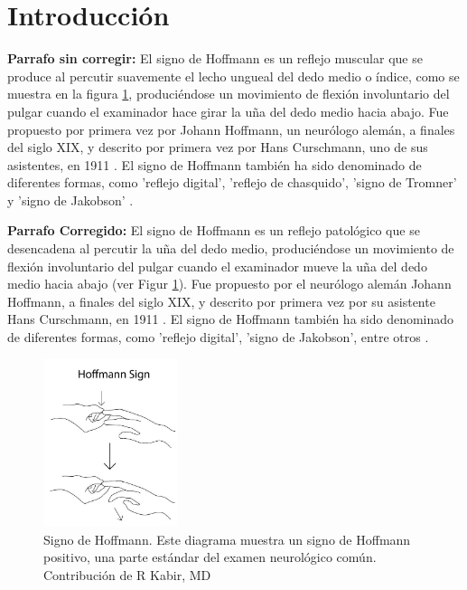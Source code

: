 \section{Introducción}
\textbf{Parrafo sin corregir:} El signo de Hoffmann es un reflejo muscular que se produce al percutir suavemente el lecho ungueal del dedo medio o índice, como se muestra en la figura \ref{fig:Hoffmann_sign}, produciéndose un movimiento de flexión involuntario del pulgar cuando el examinador hace girar la uña del dedo medio hacia abajo. Fue propuesto por primera vez por Johann Hoffmann, un neurólogo alemán, a finales del siglo XIX, y descrito por primera vez por Hans Curschmann, uno de sus asistentes, en 1911 \cite{BENDHEIM}. El signo de Hoffmann también ha sido denominado de diferentes formas, como 'reflejo digital', 'reflejo de chasquido', 'signo de Tromner' y 'signo de Jakobson' \cite{glaser2001cervical}.


\textbf{Parrafo Corregido:} El signo de Hoffmann es un reflejo patológico que se desencadena al percutir la uña del dedo medio, produciéndose un movimiento de flexión involuntario del pulgar cuando el examinador mueve la uña del dedo medio hacia abajo (ver Figur \ref{fig:Hoffmann_sign}). Fue propuesto por el neurólogo alemán Johann Hoffmann, a finales del siglo XIX, y descrito por primera vez por su asistente Hans Curschmann, en 1911 \cite{BENDHEIM}. El signo de Hoffmann también ha sido denominado de diferentes formas, como 'reflejo digital', 'signo de Jakobson', entre otros \cite{glaser2001cervical}.

\begin{figure}[h!]
	\includegraphics[width=0.35\textwidth]{figures/Kabir_Hoffmann__Sign.jpg}
	\caption{Signo de Hoffmann. Este diagrama muestra un signo de Hoffmann positivo, una parte estándar del examen neurológico común. Contribución de R Kabir, MD}
	\label{fig:Hoffmann_sign}
\end{figure}

